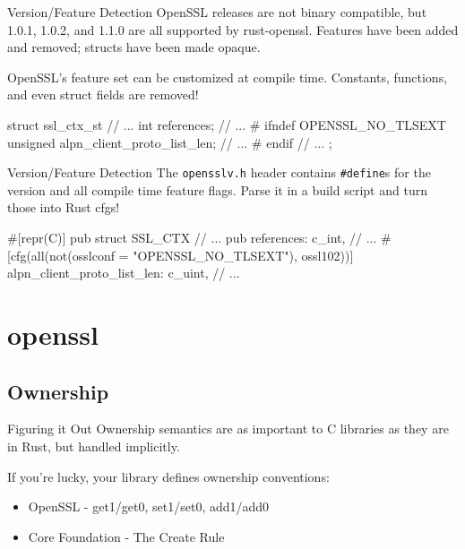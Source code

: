 \documentclass{beamer}
\begin{document}
\begin{frame}[fragile]{Version/Feature Detection}
    OpenSSL releases are not binary compatible, but 1.0.1, 1.0.2, and 1.1.0 are
    all supported by rust-openssl. Features have been added and removed;
    structs have been made opaque.

    OpenSSL's feature set can be customized at compile time. Constants,
    functions, and even struct fields are removed!

    \begin{ccode}
struct ssl_ctx_st {
    // ...
    int references;
    // ...
#  ifndef OPENSSL_NO_TLSEXT
    unsigned alpn_client_proto_list_len;
    // ...
#  endif
    // ...
};
    \end{ccode}
\end{frame}

\begin{frame}[fragile]{Version/Feature Detection}
    The \verb!opensslv.h! header contains \verb!#define!s for the version and
    all compile time feature flags. Parse it in a build script and turn those
    into Rust cfgs!

    \begin{rustcode}
#[repr(C)]
pub struct SSL_CTX {
    // ...
    pub references: c_int,
    // ...
    #[cfg(all(not(osslconf = "OPENSSL_NO_TLSEXT"),
              ossl102))]
    alpn_client_proto_list_len: c_uint,
    // ...
}
    \end{rustcode}
\end{frame}

\section{openssl}

\subsection{Ownership}

\begin{frame}{Figuring it Out}
    Ownership semantics are as important to C libraries as they are in Rust,
    but handled implicitly.

    If you're lucky, your library defines ownership conventions:
    \begin{itemize}
        \item OpenSSL - get1/get0, set1/set0, add1/add0
        \item Core Foundation - The Create Rule
    \end{itemize}
\end{frame}
\end{document}
